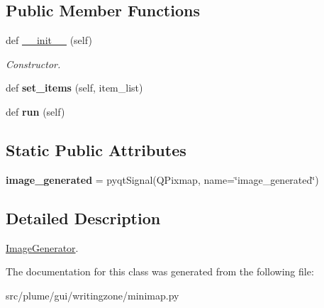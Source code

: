 \subsection*{Public Member Functions}
\begin{DoxyCompactItemize}
\item 
def \hyperlink{classplume-creator_1_1src_1_1plume_1_1gui_1_1writingzone_1_1minimap_1_1_image_generator_a1bb7c67b09f763daff01df830692c882}{\+\_\+\+\_\+init\+\_\+\+\_\+} (self)\hypertarget{classplume-creator_1_1src_1_1plume_1_1gui_1_1writingzone_1_1minimap_1_1_image_generator_a1bb7c67b09f763daff01df830692c882}{}\label{classplume-creator_1_1src_1_1plume_1_1gui_1_1writingzone_1_1minimap_1_1_image_generator_a1bb7c67b09f763daff01df830692c882}

\begin{DoxyCompactList}\small\item\em Constructor. \end{DoxyCompactList}\item 
def {\bfseries set\+\_\+items} (self, item\+\_\+list)\hypertarget{classplume-creator_1_1src_1_1plume_1_1gui_1_1writingzone_1_1minimap_1_1_image_generator_a89fc90f3b5a5a6376e5715c3dfb625ee}{}\label{classplume-creator_1_1src_1_1plume_1_1gui_1_1writingzone_1_1minimap_1_1_image_generator_a89fc90f3b5a5a6376e5715c3dfb625ee}

\item 
def {\bfseries run} (self)\hypertarget{classplume-creator_1_1src_1_1plume_1_1gui_1_1writingzone_1_1minimap_1_1_image_generator_a4dc1cf43eb333a3d74b95696380ebede}{}\label{classplume-creator_1_1src_1_1plume_1_1gui_1_1writingzone_1_1minimap_1_1_image_generator_a4dc1cf43eb333a3d74b95696380ebede}

\end{DoxyCompactItemize}
\subsection*{Static Public Attributes}
\begin{DoxyCompactItemize}
\item 
{\bfseries image\+\_\+generated} = pyqt\+Signal(\textquotesingle{}Q\+Pixmap\textquotesingle{}, name=\char`\"{}image\+\_\+generated\char`\"{})\hypertarget{classplume-creator_1_1src_1_1plume_1_1gui_1_1writingzone_1_1minimap_1_1_image_generator_a4fad4371f5e05005130477956c838359}{}\label{classplume-creator_1_1src_1_1plume_1_1gui_1_1writingzone_1_1minimap_1_1_image_generator_a4fad4371f5e05005130477956c838359}

\end{DoxyCompactItemize}


\subsection{Detailed Description}
\hyperlink{classplume-creator_1_1src_1_1plume_1_1gui_1_1writingzone_1_1minimap_1_1_image_generator}{Image\+Generator}. 

The documentation for this class was generated from the following file\+:\begin{DoxyCompactItemize}
\item 
src/plume/gui/writingzone/minimap.\+py\end{DoxyCompactItemize}
